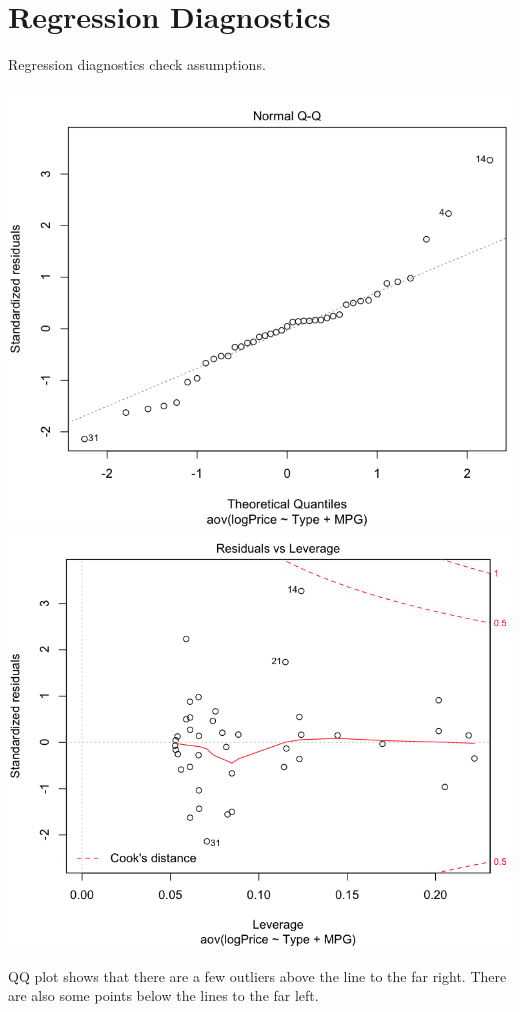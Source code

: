 \documentclass[a4 paper, 11 pt]{article}
\begin{document}
\section{Regression Diagnostics}
Regression diagnostics check assumptions.
\begin{center}
\includegraphics[scale=0.3]{diagqq}
\includegraphics[scale=0.3]{diagstd}
\end{center}
QQ plot shows that there are a few outliers above the line to the far right. There are also some points below the lines to the far left.
\end{document}
